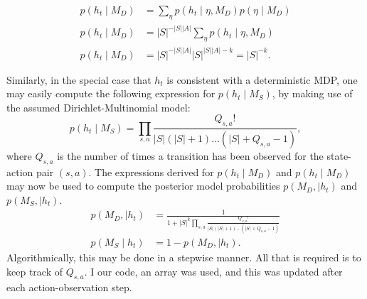 \documentclass{scrartcl}
\begin{document}
\begin{align*}
p(h_t \mid M_D) & = \sum_{\eta} p(h_t \mid \eta, M_D) p(\eta \mid M_D) \\
p(h_t \mid M_D) & = |S|^{-|S||A|} \sum_{\eta} p(h_t \mid \eta, M_D) \\
p(h_t \mid M_D) & = |S|^{-|S||A|} |S|^{|S||A| - k} = |S|^{-k} .
\end{align*}

Similarly, in the special case that $h_t$ is consistent with a deterministic MDP, one may easily compute the following expression for $p(h_t \mid M_S)$, by making use of the assumed Dirichlet-Multinomial model:
\begin{equation*}
p(h_t \mid M_S) = \prod_{s, a} \frac{Q_{s, a} !}{|S| (|S| + 1) \dots (|S| + Q_{s, a} - 1)} ,
\end{equation*}
where $Q_{s, a}$ is the number of times a transition has been observed for the state-action pair $(s, a)$. The expressions derived for $p(h_t \mid M_D)$ and $p(h_t \mid M_D)$ may now be used to compute the posterior model probabilities $p(M_D, \mid h_t )$ and $p(M_S, \mid h_t )$. 
\begin{align*}
p(M_D, \mid h_t ) & = \frac{1}{1 + |S|^k \prod_{s, a} \frac{Q_{s, a} !}{|S| (|S| + 1) \dots (|S| + Q_{s, a} - 1)} } \\
p(M_S \mid h_t ) & = 1 - p(M_D, \mid h_t) .
\end{align*}
Algorithmically, this may be done in a stepwise manner. All that is required is to keep track of $Q_{s,a}$. I our code, an array was used, and this was updated after each action-observation step.
\end{document}
